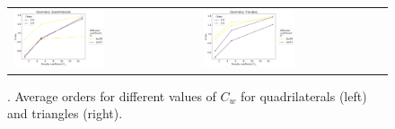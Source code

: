 \begin{example}
\begin{figure}[h!]
    \centering
    \begin{tabular}{p{} p{}}
        \vspace{0pt}
        \includegraphics[width=0.51\textwidth]{../figs/parametric/burgers_2D/orders_2_4}
        &
        \vspace{0pt}
        \includegraphics[width=0.51\textwidth]{../figs/parametric/burgers_2D/orders_2_3}
    \end{tabular}
    \caption{. Average orders for different values of $C_w$ for
        quadrilaterals (left) and triangles (right).}
    \label{fig:kucera_orders}
\end{figure}
\end{example}

